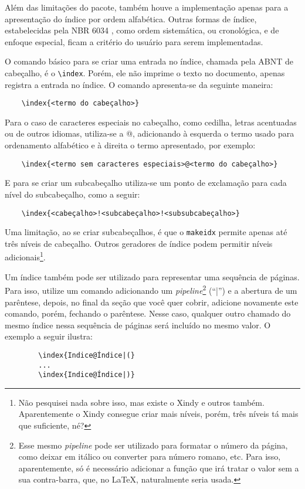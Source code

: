     Além das limitações do pacote, também houve a implementação apenas para a apresentação do índice por ordem alfabética. Outras formas de índice, estabelecidas pela NBR 6034 \cite{livro:abnt-nbr6034:2004}, como ordem sistemática, ou cronológica, e de enfoque especial, ficam a critério do usuário para serem implementadas.

    O comando básico para se criar uma entrada no índice, chamada pela ABNT de cabeçalho, é o \verb|\index|. Porém, ele não imprime o texto no documento, apenas registra a entrada no índice. O comando apresenta-se da seguinte maneira:
\begin{verbatim}
    \index{<termo do cabeçalho>}
\end{verbatim}
    
    Para o caso de caracteres especiais no cabeçalho, como cedilha, letras acentuadas ou de outros idiomas, utiliza-se a @, adicionando à esquerda o termo usado para ordenamento alfabético e à direita o termo apresentado, por exemplo:
\begin{verbatim}
    \index{<termo sem caracteres especiais>@<termo do cabeçalho>}
\end{verbatim}

    E para se criar um subcabeçalho\myIdxSubcabecalho{} utiliza-se um ponto de exclamação para cada nível do subcabeçalho, como a seguir:
\begin{verbatim}
    \index{<cabeçalho>!<subcabeçalho>!<subsubcabeçalho>}
\end{verbatim}
    Uma limitação, ao se criar subcabeçalhos, é que o \texttt{makeidx} permite apenas até três níveis de cabeçalho. Outros geradores de índice podem permitir níveis adicionais\footnote{Não pesquisei nada sobre isso, mas existe o Xindy e outros também. Aparentemente o Xindy consegue criar mais níveis, porém, três níveis tá mais que suficiente, né?}.

    Um índice também pode ser utilizado para representar uma sequência de páginas. Para isso, utilize um comando adicionando um \textit{pipeline}\footnote{Esse mesmo \textit{pipeline} pode ser utilizado para formatar o número da página, como deixar em itálico ou converter para número romano, etc. Para isso, aparentemente, só é necessário adicionar a função que irá tratar o valor sem a sua contra-barra, que, no \LaTeX{}, naturalmente seria usada.} (``|'') e a abertura de um parêntese, depois, no final da seção que você quer cobrir, adicione novamente este comando, porém, fechando o parêntese. Nesse caso, qualquer outro chamado do mesmo índice nessa sequência de páginas será incluído no mesmo valor. O exemplo a seguir ilustra:
    \begin{verbatim}
        \index{Indice@Índice|(}
        ...
        \index{Indice@Índice|)}
    \end{verbatim}
    
